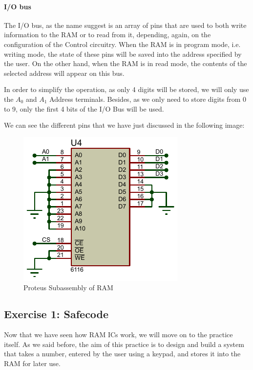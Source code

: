 \paragraph{I/O bus}

The I/O bus, as the name suggest is an array of pins that are used to both write information to the RAM or to read from it, depending, again, on the configuration of the Control circuitry. When the RAM is in program mode, i.e. writing mode, the state of these pins will be saved into the address specified by the user. On the other hand, when the RAM is in read mode, the contents of the selected address will appear on this bus.\medskip


In order to simplify the operation, as only 4 digits will be stored, we will only use the $A_0$ and $A_1$ Address terminals. Besides, as we only need to store digits from 0 to 9, only the first 4 bits of the I/O Bus will be used.\medskip

We can see the different pins that we have just discussed in the following image:\medskip

\begin{figure}[H]
    \centering
    \includegraphics[scale = 1.2]{Graphics/Practice 6/RAM/RAM_PROTEUS.PDF}
    \caption{Proteus Subassembly of RAM}
    \label{fig:RAM_PROTEUS_Subassembly}
\end{figure}

\clearpage

\subsection{Exercise 1: Safecode}

Now that we have seen how RAM ICs work, we will move on to the practice itself. As we said before, the aim of this practice is to design and build a system that takes a number, entered by the user using a keypad, and stores it into the RAM for later use. 

